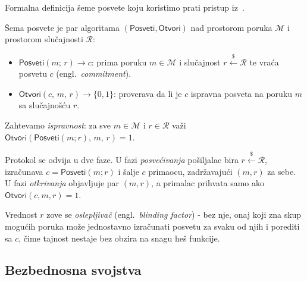 Formalna definicija šeme posvete koju koristimo prati pristup iz~\cite{smart2016cryptography}.

\begin{definition}
\label{def:commitment-scheme}
Šema posvete je par algoritama $(\mathsf{Posveti}, \mathsf{Otvori})$
nad prostorom poruka $\mathcal{M}$ i prostorom slučajnosti $\mathcal{R}$:
\begin{itemize}
  \item $\mathsf{Posveti}(m;\, r) \to c$: prima poruku $m \in \mathcal{M}$ i slučajnost
    $r \xleftarrow{\$} \mathcal{R}$ te vraća posvetu $c$ (engl.\ \textit{commitment}).
  \item $\mathsf{Otvori}(c,\, m,\, r) \to \{0,1\}$: proverava da li je $c$ ispravna
    posveta na poruku $m$ sa slučajnošću $r$.
\end{itemize}
Zahtevamo \emph{ispravnost}: za sve $m \in \mathcal{M}$ i $r \in \mathcal{R}$ važi
$\mathsf{Otvori}(\mathsf{Posveti}(m; r),\, m,\, r) = 1$.
\end{definition}

Protokol se odvija u dve faze. U fazi \emph{posvećivanja} pošiljalac bira
$r \xleftarrow{\$} \mathcal{R}$, izračunava $c = \mathsf{Posveti}(m; r)$ i šalje $c$
primaocu, zadržavajući $(m, r)$ za sebe. U fazi \emph{otkrivanja} objavljuje par $(m, r)$,
a primalac prihvata samo ako $\mathsf{Otvori}(c, m, r) = 1$.

Vrednost $r$ zove se \emph{oslepljivač} (engl.\ \textit{blinding factor}) - bez nje,
onaj koji zna skup mogućih poruka može jednostavno izračunati posvetu za svaku
od njih i porediti sa $c$, čime tajnost nestaje bez obzira na snagu heš funkcije.

\subsection*{Bezbednosna svojstva}

